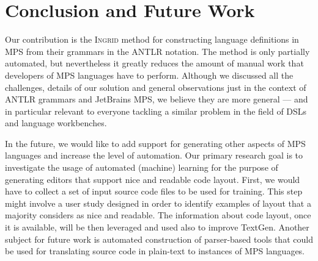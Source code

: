 \section{Conclusion and Future Work}

Our contribution is the \textsc{Ingrid} method for constructing language definitions in MPS from their grammars in the ANTLR notation.
The method is only partially automated, but nevertheless it greatly reduces the amount of manual work that developers of MPS languages have to perform.
Although we discussed all the challenges, details of our solution and general observations just in the context of ANTLR grammars and JetBrains MPS, we believe they are more general --- and in particular relevant to everyone tackling a similar problem in the field of DSLs and language workbenches.

In the future, we would like to add support for generating other aspects of MPS languages and increase the level of automation.
Our primary research goal is to investigate the usage of automated (machine) learning for the purpose of generating editors that support nice and readable code layout.
First, we would have to collect a set of input source code files to be used for training. This step might involve a user study designed in order to identify examples of layout that a majority considers as nice and readable.
The information about code layout, once it is available, will be then leveraged and used also to improve TextGen.
Another subject for future work is automated construction of parser-based tools that could be used for translating source code in plain-text to instances of MPS languages.

